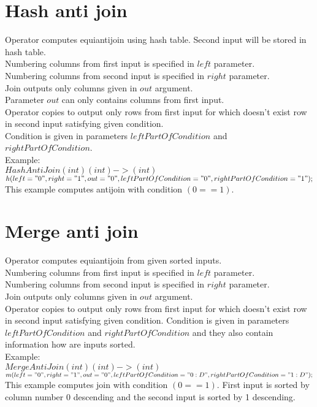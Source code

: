 \documentclass{article}
\begin{document}
\section{Hash anti join}
Operator computes equiantijoin using hash table. Second input will be stored in hash table.\\
Numbering columns from first input is specified in $left$ parameter.\\
Numbering columns from second input is specified in $right$ parameter.\\
Join outputs only columns given in $out$ argument.\\
Parameter $out$ can only contains columns from first input.\\
Operator copies to output only rows from first input for which doesn't exist row in second input satisfying given condition.\\
Condition is given in parameters $leftPartOfCondition$ and $rightPartOfCondition$.\\
Example:\\
$HashAntiJoin(int)(int)->(int)$\\
$h(left="0",right="1",out="0",leftPartOfCondition="0",rightPartOfCondition="1");$\\ 
This example computes antijoin with condition $(0==1)$.

\section{Merge anti join}
Operator computes equiantijoin from given sorted inputs.\\
Numbering columns from first input is specified in $left$ parameter.\\
Numbering columns from second input is specified in $right$ parameter.\\
Join outputs only columns given in $out$ argument.\\
Operator copies to output only rows from first input for which doesn't exist row in second input satisfying given condition.
Condition is given in parameters $leftPartOfCondition$ and $rightPartOfCondition$ and they also contain information how are inputs sorted.\\
Example:\\
$MergeAntiJoin(int)(int)->(int)$\\
$m(left="0",right="1",out="0",leftPartOfCondition="0:D",rightPartOfCondition="1:D");$\\ 
This example computes join with condition $(0==1)$. First input is sorted by column number 0 descending and the second input is sorted by 1 descending.
\end{document}
